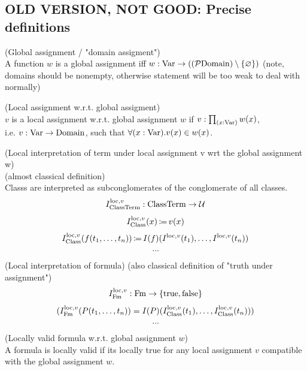 \subsection{OLD VERSION, NOT GOOD: Precise definitions}
\begin{definition}(Global assignment / "domain assigment")\\
A function $w$ is a global assignment iff
$w:\mathrm{Var}\to((\mathcal{P}\mathrm{Domain})\setminus\{\varnothing\})$
(note, domains should be nonempty, otherwise statement will be too weak to deal with normally)
\end{definition}
\begin{definition}(Local assignment w.r.t. global assigment)\\
$v$ is a local assignment w.r.t. global assignment $w$ if $v:\prod_{(x:\mathrm{Var})}w(x)$,\\
i.e. $v:\mathrm{Var}\to\mathrm{Domain}$, such that $\forall (x:\mathrm{Var}) . v(x) \in w(x)$.\\
\end{definition}
\begin{definition}(Local interpretation of term under local assignment v wrt the global assignment w)\\
(almost classical definition)\\%
Classs are interpreted as subconglomerates of the conglomerate of all classes.
\[
I^{\mathrm{loc},v}_{\text{ClassTerm}} : {\text{ClassTerm}} \to \mathcal{U}
\]
\[
I^{\mathrm{loc},v}_{\text{Class}}(x) \,{\coloneqq}\, v(x)
\]
\[
I^{\mathrm{loc},v}_{\text{Class}}(f(t_1,\dots,t_n)) \,{\coloneqq}\, I(f)(I^{\mathrm{loc},v}(t_1),\dots,I^{\mathrm{loc},v}(t_n))
\]
\[
\dots
\]
\end{definition}
\begin{definition}(Local interpretation of formula)
(also classical definition of "truth under assignment")
\[
I^{\mathrm{loc},v}_{\mathrm{Fm}} : \mathrm{Fm} \to \{\mathrm{true}, \mathrm{false}\}
\]
\[
(I^{\mathrm{loc},v}_{\mathrm{Fm}}(P(t_1,\dots,t_n))=I(P)(I^{\mathrm{loc},v}_{\text{Class}}(t_1),\dots,I^{\mathrm{loc},v}_{\text{Class}}(t_n)))
\]
\[
\dots
\]

\end{definition}
\begin{definition}(Locally valid formula w.r.t. global assignment $w$)\\
A formula is locally valid if its locally true for any local assignment $v$ compatible with the global assignment $w$.
\end{definition}
